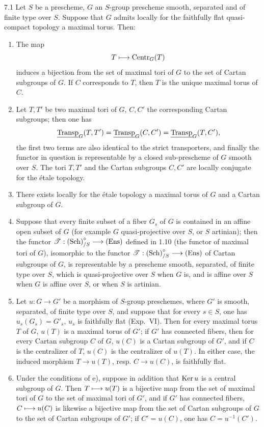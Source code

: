\begin{theorem}{7.1}\label{XII.7.1}
Let $S$ be a prescheme, $G$ an $S$-group prescheme smooth, separated and of finite type over $S$. Suppose that $G$ admits locally for the faithfully flat quasi-compact topology a maximal torus. Then:
\begin{enumerate}[label=\alph*)]
\item The map
\[
T\longmapsto\operatorname{Centr}_G(T)
\]
induces a bijection from the set of maximal tori of $G$ to the set of Cartan subgroups of $G$. If $C$ corresponds to $T$, then $T$ is the unique maximal torus of $C$.
\item Let $T,T'$ be two maximal tori of $G$, $C,C'$ the corresponding Cartan subgroups; then one has
\[
\underline{\operatorname{Transp}}_G(T,T')=\underline{\operatorname{Transp}}_G(C,C')=\underline{\operatorname{Transp}}_G(T,C'),
\]
the first two terms are also identical to the strict transporters, and finally the functor in question is representable by a closed sub-prescheme of $G$ smooth over $S$. The tori $T,T'$ and the Cartan subgroups $C,C'$ are locally conjugate for the étale topology.
\item There exists locally for the étale topology a maximal torus of $G$ and a Cartan subgroup of $G$.
\item Suppose that every finite subset of a fiber $G_s$ of $G$ is contained in an affine open subset of $G$ (for example $G$ quasi-projective over $S$, or $S$ artinian); then the functor $\mathscr T:\textup{(Sch)}^\circ_{/S}\longrightarrow\textup{(Ens)}$ defined in 1.10 (the functor of maximal tori of $G$), isomorphic to the functor $\mathscr T:\textup{(Sch)}^\circ_{/S}\longrightarrow\textup{(Ens)}$ of Cartan subgroups of $G$, is representable by a prescheme smooth, separated, of finite type over $S$, which is quasi-projective over $S$ when $G$ is, and is affine over $S$ when $G$ is affine over $S$, or when $S$ is artinian.
\item Let $u:G\to G'$ be a morphism of $S$-group preschemes, where $G'$ is smooth, separated, of finite type over $S$, and suppose that for every $s\in S$, one has $u_s(G_s)=G'_s$, \ie $u_s$ is faithfully flat (Exp.~VI). Then for every maximal torus $T$ of $G$, $u(T)$ is a maximal torus of $G'$; if $G'$ has connected fibers, then for every Cartan subgroup $C$ of $G$, $u(C)$ is a Cartan subgroup of $G'$, and if $C$ is the centralizer of $T$, $u(C)$ is the centralizer of $u(T)$. In either case, the induced morphism $T\to u(T)$, resp. $C\to u(C)$, is faithfully flat.
\item Under the conditions of e), suppose in addition that $\operatorname{Ker} u$ is a central subgroup of $G$. Then $T\longmapsto u(T)$ is a bijective map from the set of maximal tori of $G$ to the set of maximal tori of $G'$, and if $G'$ has connected fibers, $C\longmapsto u(C)$ is likewise a bijective map from the set of Cartan subgroups of $G$ to the set of Cartan subgroups of $G'$; if $C'=u(C)$, one has $C=u^{-1}(C')$.
\end{enumerate}
\end{theorem}
